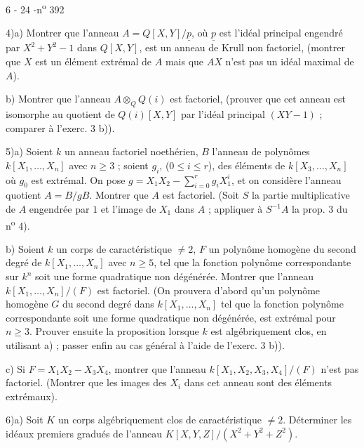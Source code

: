 

\begin{center}6 - 24 -\hfill n\textsuperscript{o} 392\end{center}

4)\quad a) Montrer que l'anneau $A=Q[X,Y]/\underline{p}$, où $\underline{p}$ est l'idéal principal engendré par $X^2+Y^2-1$ dans $Q[X,Y]$, est un anneau de Krull non factoriel, (montrer que $X$ est un élément extrémal de $A$ mais que $AX$ n'est pas un idéal maximal de $A$).

b) Montrer que l'anneau $A\otimes_Q Q(i)$ est factoriel, (prouver que cet anneau est isomorphe au quotient de $Q(i)[X,Y]$ par l'idéal principal $(XY-1)$ ; comparer à l'exerc. 3 b)).

5)\quad a) Soient $k$ un anneau factoriel noethérien, $B$ l'anneau de polynômes $k[X_1,\ldots,X_n]$ avec $n\geq 3$ ; soient $g_i$, ($0\leq i\leq r$), des éléments de $k[X_3,\ldots,X_n]$ où $g_0$ est extrémal. On pose $g=X_1X_2-\sum_{i=0}^r g_iX_1^i$, et on considère l'anneau quotient $A=B/gB$. Montrer que $A$ est factoriel. (Soit $S$ la partie multiplicative de $A$ engendrée par $1$ et l'image de $X_1$ dans $A$ ; appliquer à $S^{-1}A$ la prop. 3 du n\textsuperscript{o} 4).

b) Soient $k$ un corps de caractéristique $\ne 2$, $F$ un polynôme homogène du second degré de $k[X_1,\ldots,X_n]$ avec $n\geq 5$, tel que la fonction polynôme correspondante sur $k^n$ soit une forme quadratique non dégénérée. Montrer que l'anneau $k[X_1,\ldots,X_n]/(F)$ est factoriel. (On prouvera d'abord qu'un polynôme homogène $G$ du second degré dans $k[X_1,\ldots,X_n]$ tel que la fonction polynôme correspondante soit une forme quadratique non dégénérée, est extrémal pour $n\geq 3$. Prouver ensuite la proposition lorsque $k$ est algébriquement clos, en utilisant a) ; passer enfin au cas général à l'aide de l'exerc. 3 b)).

c) Si $F=X_1X_2-X_3X_4$, montrer que l'anneau $k[X_1,X_2,X_3,X_4]/(F)$ n'est pas factoriel. (Montrer que les images des $X_i$ dans cet anneau sont des éléments extrémaux).

6)\quad a) Soit $K$ un corps algébriquement clos de caractéristique $\ne 2$. Déterminer les idéaux premiers gradués de l'anneau $K[X,Y,Z]/(X^2+Y^2+Z^2)$.

